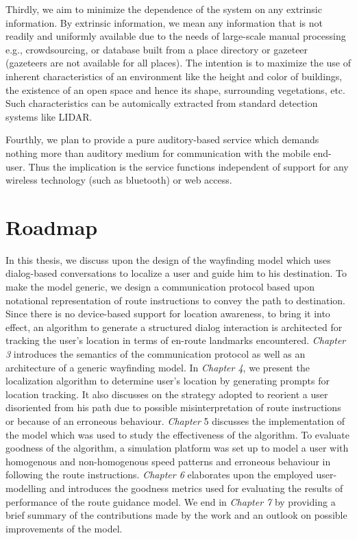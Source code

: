 \documentclass{iitkthesis}
\begin{document}
Thirdly, we aim to minimize the dependence of the system on any extrinsic information. By extrinsic information, we mean any information that is not readily and uniformly available due to the needs of large-scale manual processing e.g., crowdsourcing, or database built from a place directory or gazeteer (gazeteers are not available for all places). The intention is to maximize the use of inherent characteristics of an environment like the height and color of buildings, the existence of an open space and hence its shape, surrounding vegetations, etc. Such characteristics can be automically extracted from standard detection systems like LIDAR.

Fourthly, we plan to provide a pure auditory-based service which demands nothing more than auditory medium for communication with the mobile end-user. Thus the implication is the service functions independent of support for any wireless technology (such as bluetooth) or web access.
  \section{Roadmap}
  In this thesis, we discuss upon the design of the wayfinding model which uses dialog-based conversations to localize a user and guide him to his destination. To make the model generic, we design a communication protocol based upon notational representation of route instructions to convey the path to destination. Since there is no device-based support for location awareness, to bring it into effect, an algorithm to generate a structured dialog interaction is architected for tracking the user's location in terms of en-route landmarks encountered. \textit{Chapter 3} introduces the semantics of the communication protocol as well as an architecture of a generic wayfinding model. In \textit{Chapter 4}, we present the localization algorithm to determine user's location by generating prompts for location tracking. It also discusses on the strategy adopted to reorient a user disoriented from his path due to possible misinterpretation of route instructions or because of an erroneous behaviour. \textit{Chapter} 5 discusses the implementation of the model which was used to study the effectiveness of the algorithm. To evaluate goodness of the algorithm, a simulation platform was set up to model a user with homogenous and non-homogenous speed patterns and erroneous behaviour in following the route instructions. \textit{Chapter 6} elaborates upon the employed user-modelling and introduces the goodness metrics used for evaluating the results of performance of the route guidance model. We end in \textit{Chapter 7} by providing a brief summary of the contributions made by the work and an outlook on possible improvements of the model.
\end{document}
